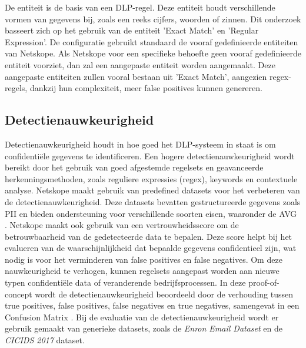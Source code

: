 De entiteit is de basis van een DLP-regel. 
Deze entiteit houdt verschillende vormen van gegevens bij, zoals een reeks cijfers, woorden of zinnen. 
Dit onderzoek basseert zich op het gebruik van de entiteit 'Exact Match' en 'Regular Expression'. 
De configuratie gebruikt standaard de vooraf gedefinieerde entiteiten van Netskope. 
Als Netskope voor een specifieke behoefte geen vooraf gedefinieerde entiteit voorziet, dan zal een aangepaste entiteit worden aangemaakt.
Deze aangepaste entiteiten zullen vooral bestaan uit 'Exact Match', aangezien regex-regels, dankzij hun complexiteit, meer false positives kunnen genereren.


\subsection{Detectienauwkeurigheid}
\label{sec:detectienauwkeurigheid-literatuurstudie}

Detectienauwkeurigheid houdt in hoe goed het DLP-systeem in staat is om confidentiële gegevens te identificeren. 
Een hogere detectienauwkeurigheid wordt bereikt door het gebruik van goed afgestemde regelsets en geavanceerde herkenningsmethoden, zoals reguliere expressies (regex), keywords en contextuele analyse.
Netskope maakt gebruik van predefined datasets voor het verbeteren van de detectienauwkeurigheid. 
Deze datasets bevatten gestructureerde gegevens zoals PII en bieden ondersteuning voor verschillende soorten eisen, waaronder de AVG \autocite{Clementelli2023}. 
Netskope maakt ook gebruik van een vertrouwheidsscore om de betrouwbaarheid van de gedetecteerde data te bepalen. 
Deze score helpt bij het evalueren van de waarschijnlijkheid dat bepaalde gegevens confidentieel zijn, 
wat nodig is voor het verminderen van false positives en false negatives. 
Om deze nauwkeurigheid te verhogen, kunnen regelsets aangepast worden aan nieuwe typen confidentiële data of veranderende bedrijfsprocessen.
In deze proof-of-concept wordt de detectienauwkeurigheid beoordeeld door de verhouding tussen true positives, false positives, 
false negatives en true negatives, samengevat in een Confusion Matrix \autocite{Microsoftn.d.}.
Bij de evaluatie van de detectienauwkeurigheid wordt er gebruik gemaakt van generieke datasets, zoals de \textit{Enron Email Dataset} en de \textit{CICIDS 2017} dataset.

